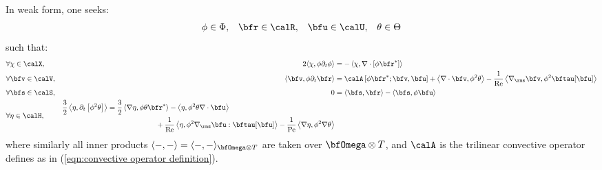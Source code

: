     In weak form, one seeks:
    \begin{align}
          \phi  \in  \Phi,  &&
          \bfr  \in  \calR,  &&
          \bfu  \in  \calU,  &&
        \theta  \in  \Theta
    \end{align}
    such that:
    \begin{align}
        &\forall  \chi  \in  \calX,  &  2\langle\chi, \phi\partial_{t}\phi\rangle  &=  - \left\langle\chi, \nabla\cdot\left[\phi\bfr^{*}\right]\right\rangle  \\
        &\forall  \bfv  \in  \calV,  &  \langle\bfv, \phi\partial_{t}\bfr\rangle  &=  \calA\left[\phi\bfr^{*}; \bfv, \bfu\right] + \left\langle\nabla\cdot\bfv, \phi^{2}\theta\right\rangle - \frac{1}{\rmRe}\left\langle\nabla_{\rms}\bfv, \phi^{2}\bftau[\bfu]\right\rangle  \\
        &\forall  \bfs  \in  \calS,  &  0  &=  \langle\bfs, \bfr\rangle - \langle\bfs, \phi\bfu\rangle  \\
        &\forall  \eta  \in  \calH,  &  
        \begin{split}
            \frac{3}{2}\left\langle\eta, \partial_{t}\left[\phi^{2}\theta\right]\right\rangle  &=  \frac{3}{2}\left\langle\nabla\eta, \phi\theta\bfr^{*}\right\rangle - \left\langle\eta, \phi^{2}\theta\nabla\cdot\bfu\right\rangle  \\
            &\;\;\;\;\;\;\;\;\;\;\;\;\;\;\;\;\;\;\;\;\;\;\;\;+ \frac{1}{\rmRe}\left\langle\eta, \phi^{2}\nabla_{\rms}\bfu:\bftau[\bfu]\right\rangle - \frac{1}{\rmPe}\left\langle\nabla\eta, \phi^{2}\nabla\theta\right\rangle
        \end{split}
    \end{align}
    where similarly all inner products $\langle -, -\rangle  =  \langle -, -\rangle_{\bfOmega\otimes T}$ are taken over $\bfOmega\otimes T$, and $\calA$ is the trilinear convective operator defines as in (\ref{eqn:convective operator definition}).
    
